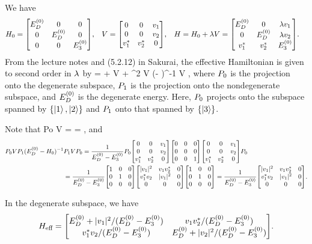 \begin{solution}
	We have
	\begin{align*}
		\Ho &= \mqty[ \Eod & 0 & 0 \\ 0 & \Eod & 0 \\ 0 & 0 & \Eoe ], &
		V &= \mqty[ 0 & 0 & \vq \\ 0 & 0 & \vw \\ \vqs & \vws & 0 ], &
		H &= \Ho + \lam V = \mqty[ \Eod & 0 & \lam \vq \\ 0 & \Eod & \lam \vw \\ \vqs & \vws & \Eoe].
	\end{align*}
	From the lecture notes and (5.2.12) in Sakurai, the effective Hamiltonian is given to second order in $\lambda$ by
	\beq
		\Heff = \Eod + \lam \Po V \Po + \lam^2 \Po V \Pq (\Eod - \Ho)^{-1} \Pq V \Po,
	\eeq
	where $P_0$ is the projection onto the degenerate subspace, $P_1$ is the projection onto the nondegenerate subspace, and $E^{(0)}_D$ is the degenerate energy.  Here, $P_0$ projects onto the subspace spanned by $\{ \ket{1}, \ket{2} \}$ and $P_1$ onto that spanned by $\{ \ket{3} \}$.
	
	Note that
	\beq
		Po V \Po = \mqty[ 1 & 0 & 0 \\ 0 & 1 & 0 \\ 0 & 0 & 0 ]  \mqty[ 1 & 0 & 0 \\ 0 & 1 & 0 \\ 0 & 0 & 0 ]
		= \mqty[ 0 & 0 & 0 \\ 0 & 0 & 0 \\ 0 & 0 & 0 ],
	\eeq
	and
	\begin{align*}
		\Po V \Pq (\Eod - \Ho)^{-1} &\Pq V \Po = \frac{1}{\Eod - \Eoe} \Po \mqty[ 0 & 0 & \vq \\ 0 & 0 & \vw \\ \vqs & \vws & 0 ] \mqty[ 0 & 0 & 0 \\ 0 & 0 & 0 \\ 0 & 0 & 1] \mqty[ 0 & 0 & \vq \\ 0 & 0 & \vw \\ \vqs & \vws & 0 ] \Po \\
		&= \frac{1}{\Eod - \Eoe} \mqty[ 1 & 0 & 0 \\ 0 & 1 & 0 \\ 0 & 0 & 0 ] \mqty[|\vq|^2 & \vq \vws & 0 \\ \vqs \vw & |\vq|^2 & 0 \\ 0 & 0 & 0] \mqty[ 1 & 0 & 0 \\ 0 & 1 & 0 \\ 0 & 0 & 0 ]
		= \frac{1}{\Eod - \Eoe} \mqty[|\vq|^2 & \vq \vws & 0 \\ \vqs \vw & |\vq|^2 & 0 \\ 0 & 0 & 0].
	\end{align*}
	
	In the degenerate subspace, we have
	\begin{align*}
		\Heff = \mqty[ \Eod + |\vq|^2/(\Eod - \Eoe) & \vq \vws / (\Eod - \Eoe) \\ \vqs \vw / (\Eod - \Eoe) & \Eod + |\vw|^2/(\Eod - \Eoe)].
	\end{align*}
\end{solution}


